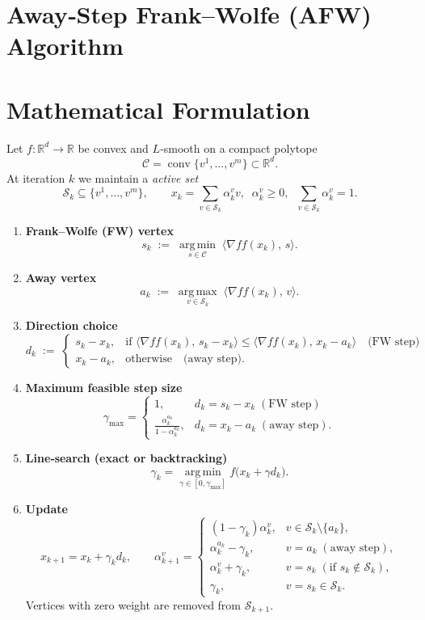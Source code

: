 \documentclass[11pt]{article}
\newcommand{\R}{\mathbb{R}}
\newcommand{\C}{\mathcal{C}}
\newcommand{\grad}{\nabla f}
\newcommand{\argmin}{\operatorname*{arg\,min}}
\newcommand{\argmax}{\operatorname*{arg\,max}}
\begin{document}
\section*{Away‑Step Frank–Wolfe (AFW) Algorithm}

\section*{Mathematical Formulation}
Let $f:\R^{d}\to\R$ be convex and $L$‑smooth on a compact polytope 
\[
\C = \operatorname{conv}\{v^{1},\dots ,v^{m}\}\subset\R^{d}.
\]
At iteration $k$ we maintain a \emph{active set} 
\[
\mathcal{S}_{k}\subseteq\{v^{1},\dots ,v^{m}\},
\qquad 
x_{k}= \sum_{v\in\mathcal{S}_{k}}\alpha_{k}^{v}v,\;\;
\alpha_{k}^{v}\ge 0,\;\;\sum_{v\in\mathcal{S}_{k}}\alpha_{k}^{v}=1.
\]

\begin{enumerate}
\item \textbf{Frank–Wolfe (FW) vertex}
\[
s_{k} \;:=\; \argmin_{s\in\C}\;\langle \grad f(x_{k}),\,s\rangle .
\tag{1}
\]

\item \textbf{Away vertex}
\[
a_{k} \;:=\; \argmax_{v\in\mathcal{S}_{k}}\;\langle \grad f(x_{k}),\,v\rangle .
\tag{2}
\]

\item \textbf{Direction choice}
\[
d_{k}\;:=\;
\begin{cases}
s_{k}-x_{k}, & \text{if }\langle \grad f(x_{k}),\,s_{k}-x_{k}\rangle
\le \langle \grad f(x_{k}),\,x_{k}-a_{k}\rangle
\quad\text{(FW step)}\\[4pt]
x_{k}-a_{k}, & \text{otherwise}
\quad\text{(away step)} .
\end{cases}
\tag{3}
\]

\item \textbf{Maximum feasible step size}
\[
\gamma_{\max }=
\begin{cases}
1, & d_{k}=s_{k}-x_{k}\;( \text{FW step})\\[4pt]
\displaystyle\frac{\alpha_{k}^{a_{k}}}{1-\alpha_{k}^{a_{k}}}, &
d_{k}=x_{k}-a_{k}\;( \text{away step}) .
\end{cases}
\tag{4}
\]

\item \textbf{Line‑search (exact or backtracking)}  
\[
\gamma_{k}= \argmin_{\gamma\in[0,\gamma_{\max}]}
f\!\bigl(x_{k}+ \gamma d_{k}\bigr).
\tag{5}
\]

\item \textbf{Update}
\[
x_{k+1}=x_{k}+ \gamma_{k} d_{k},
\qquad
\alpha_{k+1}^{v}= 
\begin{cases}
(1-\gamma_{k})\alpha_{k}^{v}, & v\in\mathcal{S}_{k}\setminus\{a_{k}\},\\[4pt]
\alpha_{k}^{a_{k}}-\gamma_{k}, & v=a_{k}\;( \text{away step}),\\[4pt]
\alpha_{k}^{v}+\gamma_{k}, & v=s_{k}\;( \text{if }s_{k}\notin\mathcal{S}_{k}),\\[4pt]
\gamma_{k}, & v=s_{k}\in\mathcal{S}_{k}.
\end{cases}
\tag{6}
\]
Vertices with zero weight are removed from $\mathcal{S}_{k+1}$.
\end{enumerate}
\end{document}
